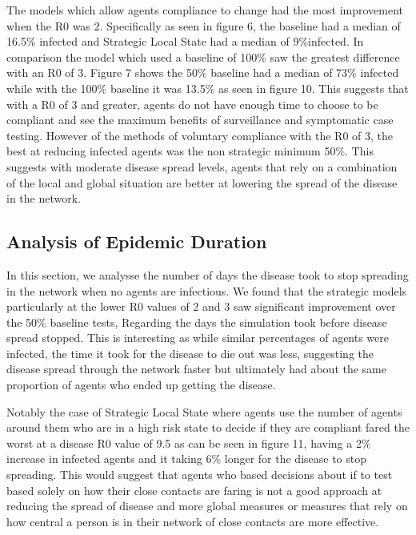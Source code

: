 \documentclass{article}
\begin{document}
The models which allow agents compliance to change had the most improvement when the R0 was 2. Specifically as seen in figure 6, the baseline had a median of 16.5\% infected and Strategic Local State had a median of 9\%infected. In comparison the model which used a baseline of 100\% saw the greatest difference with an R0 of 3. Figure 7 shows the 50\% baseline had a median of 73\% infected while with the 100\% baseline it was 13.5\% as seen in figure 10. This suggests that with a R0 of 3 and greater, agents do not have enough time to choose to be compliant and see the maximum benefits of surveillance and symptomatic case testing. However of the methods of voluntary compliance with the R0 of 3, the best at reducing infected agents was the non strategic minimum 50\%. This suggests with moderate disease spread levels, agents that rely on a combination of the local and global situation are better at lowering the spread of the disease in the network. \newline
\newpage

\subsection{Analysis of Epidemic Duration}
In this section, we analysse the number of days the disease took to stop spreading in the network when no agents are infectious. We found that the strategic models particularly at the lower R0 values of 2 and 3 saw significant improvement over the 50\% baseline tests, Regarding the days the simulation took before disease spread stopped. This is interesting as while similar percentages of agents were infected, the time it took for the disease to die out was less, suggesting the disease spread through the network faster but ultimately had about the same proportion of agents who ended up getting the disease.\newline 

Notably the case of Strategic Local State where agents use the number of agents around them who are in a high risk state to decide if they are compliant fared the worst at a disease R0 value of 9.5 as can be seen in figure 11, having a 2\% increase in infected agents and it taking 6\% longer for the disease to stop spreading. This would suggest that agents who based decisions about if to test based solely on how their close contacts are faring is not a good approach at reducing the spread of disease and more global measures or measures that rely on how central a person is in their network of close contacts are more effective. \newline 
\end{document}
